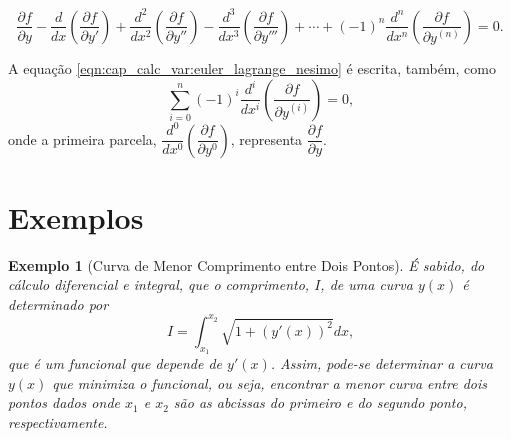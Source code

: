 \documentclass[
	12pt,				%
	openright,			%
    twoside,			%
	a4paper,			%
	english,			%
	french,				%
	spanish,			%
	brazil				%
	]{abntex2}
\newtheorem{exemplo}{Exemplo}
\numberwithin{lema}{chapter}
\numberwithin{teorema}{chapter}
\numberwithin{definicao}{chapter}
\numberwithin{exemplo}{chapter}
\numberwithin{figure}{chapter}
\begin{document}
\begin{equation}
	\label{eqn:cap_calc_var:euler_lagrange_nesimo}
	\frac{\partial f}{\partial y}
	- \frac{d}{dx}\left ( \frac{\partial f}{\partial y'} \right )
	+ \frac{d^2}{dx^2}\left ( \frac{\partial f}{\partial y''} \right )
	- \frac{d^3}{dx^3}\left ( \frac{\partial f}{\partial y'''} \right )
	+ \cdots
	+ (-1)^n \frac{d^n}{dx^n}\left (\frac{\partial f}{\partial y^{(n)}} \right )
	= 0
	\text{.}
\end{equation}

A equação \eqref{eqn:cap_calc_var:euler_lagrange_nesimo} é escrita, também, como
$$
	\sum_{i=0}^n (-1)^i\frac{d^i}{dx^i}\left (
		\frac{\partial f}{\partial y^{(i)}}
	\right )
	= 0
	\text{,}
$$
onde a primeira parcela, $\dfrac{d^0}{dx^0} \left ( \dfrac{\partial f}{\partial y^0} \right )$, representa $\dfrac{\partial f}{\partial y}$.




\section{Exemplos}
\label{sec:calcvar_exemplos}

\begin{exemplo}[Curva de Menor Comprimento entre Dois Pontos]
	É sabido, do cálculo diferencial e integral, que o comprimento, $I$, de uma curva $y(x)$ é determinado por
	\begin{equation}
		\label{eqn:ex_reta_funcional}
		I=\int_{x_1}^{x_2}\sqrt{1+(y'(x))^2}dx
		\text{,}
	\end{equation}
	que é um funcional que depende de $y'(x)$. Assim, pode-se determinar a curva $y(x)$ que minimiza o funcional, ou seja, encontrar a menor curva entre dois pontos dados onde $x_1$ e $x_2$ são as abcissas do primeiro e do segundo ponto, respectivamente.
\end{exemplo}
\end{document}
